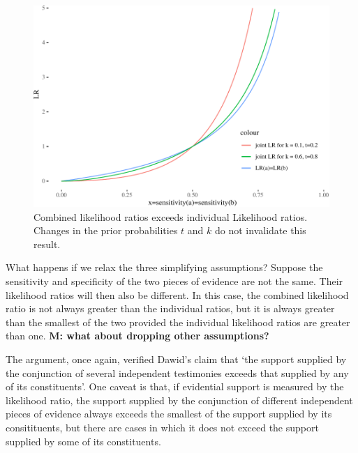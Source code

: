 \documentclass[10pt,dvipsnames,enabledeprecatedfontcommands]{scrartcl}
\begin{document}
\begin{figure}


\begin{center}\includegraphics[width=0.9\linewidth]{conjunction-paradox_files/figure-latex/unnamed-chunk-8-1} \end{center}

\caption{Combined likelihood ratios exceeds individual Likelihood ratios. Changes in the prior 
probabilities $t$ and $k$ do not invalidate this result.}
\label{fig:jointLRMarcello}
\end{figure}

What happens if we relax the three simplifying assumptions? Suppose the
sensitivity and specificity of the two pieces of evidence are not the
same. Their likelihood ratios will then also be different. In this case,
the combined likelihood ratio is not always greater than the individual
ratios, but it is always greater than the smallest of the two provided
the individual likelihood ratios are greater than one.
\textbf{M: what about dropping other assumptions?}


The argument, once again, verified Dawid's claim that `the support
supplied by the conjunction of several independent testimonies exceeds
that supplied by any of its constituents'. One caveat is that, if
evidential support is measured by the likelihood ratio, the support
supplied by the conjunction of different independent pieces of evidence
always exceeds the smallest of the support supplied by its
consitituents, but there are cases in which it does not exceed the
support supplied by some of its constituents.
\end{document}
